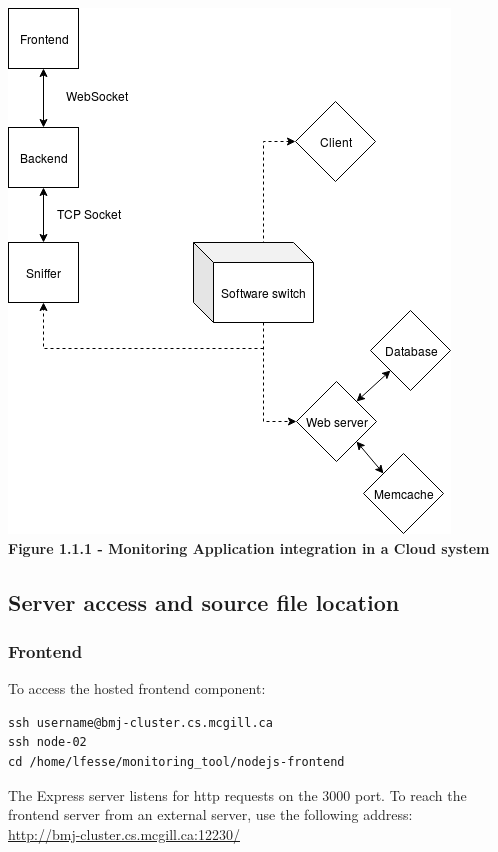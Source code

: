 \documentclass[12pt,hidelinks]{article}
\begin{document}
	\begin{center}	
	\includegraphics[scale=0.5]{assets/app-architecture.png} \\
	\textbf{Figure 1.1.1 - Monitoring Application integration
	in a Cloud system}
	\end{center}

	\subsection{Server access and source file location}
	\subsubsection{Frontend}

    To access the hosted frontend component:
    \begin{verbatim}
ssh username@bmj-cluster.cs.mcgill.ca
ssh node-02
cd /home/lfesse/monitoring_tool/nodejs-frontend
\end{verbatim}

    The Express server listens for http requests on the 3000 port.
    To reach the frontend server from an external server, use the following address: \\ 
	\url{http://bmj-cluster.cs.mcgill.ca:12230/}
	
\end{document}
